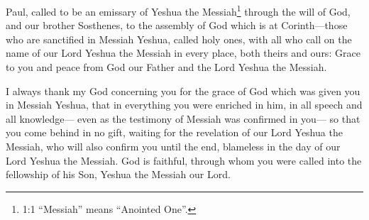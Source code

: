 





\vspace{-1.36in}


\mychapter{} \myverse*{}Paul, called to be an emissary of Yeshua the Messiah\footnote{1:1 “Messiah” means “Anointed One”.} through the will of God, and our brother Sosthenes,
\myverse{}to the assembly of God which is at Corinth—those who are sanctified in Messiah
Yeshua, called holy ones, with all who call on the name of our Lord Yeshua the Messiah in every place,
both theirs and ours:
\myverse{}Grace to you and peace from God our Father and the Lord Yeshua the Messiah.

\myverse{}I always thank my God concerning you for the grace of God which
was given you in Messiah Yeshua,
\myverse{}that in everything you were enriched in him, in all speech and all knowledge—
\myverse{}even as the testimony of Messiah was confirmed in you—
\myverse{}so that you come behind in no gift, waiting for the revelation of our Lord Yeshua the Messiah,
\myverse{}who will also confirm you until the end, blameless in the day of our Lord Yeshua the Messiah.
\myverse{}God is faithful, through whom you were called into the fellowship of his Son,
Yeshua the Messiah our Lord.

